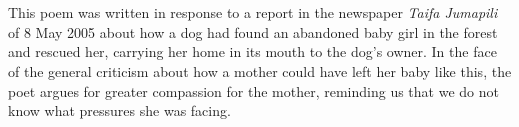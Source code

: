 \documentclass[a4paper, 12pt]{report}
\begin{document}
\begin{center}
 \\
 \\
\vspace{8mm}
\end{center}

\begin{small}
This poem was written in response to a report in the newspaper \textit{Taifa Jumapili} of 8 May 2005 about how a dog had found an abandoned baby girl in the forest and rescued her, carrying her home in its mouth to the dog's owner.  In the face of the general criticism about how a mother could have left her baby like this, the poet argues for greater compassion for the mother, reminding us that we do not know what pressures she was facing.
\end{small}
\vspace{8mm}
\end{document}
